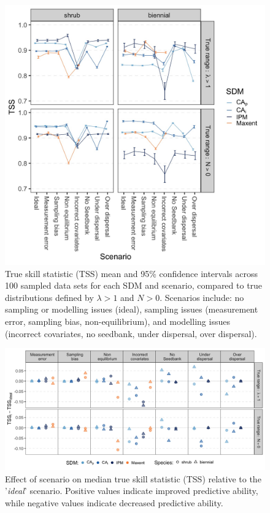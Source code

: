 \documentclass[preprint,review,times,12pt]{elsarticle}
\begin{document}
\begin{figure}
	\centering\includegraphics[width=5in]{figs/fig_TSS_mn+CI.jpg}
	\caption{\label{fig:TSSmn} True skill statistic (TSS) mean and 95\% confidence intervals across 100 sampled data sets for each SDM and scenario, compared to true distributions defined by $\lambda > 1$ and $N > 0$. Scenarios include: no sampling or modelling issues (ideal), sampling issues (measurement error, sampling bias, non-equilibrium), and modelling issues (incorrect covariates, no seedbank, under dispersal, over dispersal).}
\end{figure}

\begin{figure}
	\centering\includegraphics[width=\linewidth]{figs/fig_TSSvIdeal.jpg}
	\caption{\label{fig:TSSvIdeal} Effect of scenario on median true skill statistic (TSS) relative to the '\emph{ideal}' scenario. Positive values indicate improved predictive ability, while negative values indicate decreased predictive ability.}
\end{figure}
\end{document}
